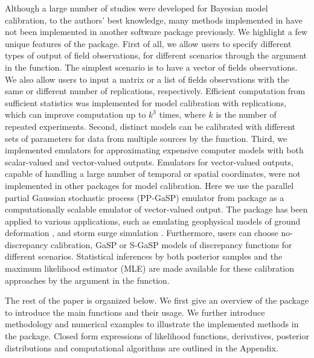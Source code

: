 Although a large number of studies were developed for Bayesian model calibration, to the authors' best knowledge, many methods implemented in  have not been implemented in another software package previously. We highlight a few unique features of the  package. First of all, we allow users to specify different types of output of field observations, for different scenarios through the  argument in the  function. The simplest scenario is to have a vector of fields observations. We also allow users to input a matrix  or a list of fields observations with the same or different number of replications, respectively. Efficient computation from  sufficient statistics was implemented for model calibration with replications, which can improve computation up to $k^3$ times, where $k$ is the number of repeated experiments. Second, {distinct models can be calibrated with different sets of parameters for data from multiple sources by the   function}. %
Third, we implemented  emulators for approximating expensive computer models with both scalar-valued  and vector-valued outputs.  Emulators for vector-valued outputs, capable of handling a large number of temporal or spatial coordinates, were not implemented in other packages for  model calibration. Here we use the parallel partial Gaussian stochastic process  (PP-GaSP) emulator from  package \citep{gu2018robustgasp} as a computationally scalable emulator of vector-valued output. The   package has been applied to various applications, such as emulating geophysical models of ground deformation   \citep{anderson2019magma}, and storm surge simulation \citep{ma2022multifidelity}. 
{Furthermore, users can choose no-discrepancy calibration,  GaSP or S-GaSP models of discrepancy functions for different scenarios. Statistical inferences by both posterior samples and the maximum likelihood estimator (MLE) are  made available for these calibration approaches by the  argument in the  function. }



The rest of the paper is organized below. {We first give an overview of the  package to introduce the main functions and their usage.    We further introduce methodology and numerical examples to illustrate the implemented methods in the  package.     Closed form expressions of likelihood functions, derivatives,  posterior distributions and computational algorithms are outlined in the Appendix. }


